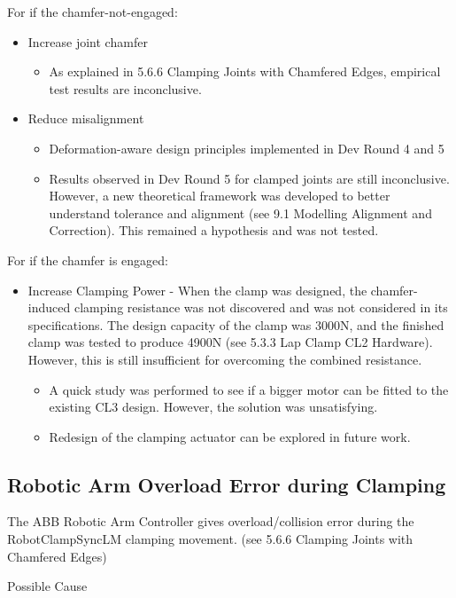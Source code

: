 For if the chamfer-not-engaged:
\begin{itemize}
\item Increase joint chamfer
    \begin{itemize}
    \item As explained in 5.6.6 Clamping Joints with Chamfered Edges, empirical test results are inconclusive.
    \end{itemize}
\item Reduce misalignment 
    \begin{itemize}
    \item Deformation-aware design principles implemented in Dev Round 4 and 5
    \item Results observed in Dev Round 5 for clamped joints are still inconclusive. However, a new theoretical framework was developed to better understand tolerance and alignment (see 9.1 Modelling Alignment and Correction). This remained a hypothesis and was not tested.
    \end{itemize}
\end{itemize}

For if the chamfer is engaged:
\begin{itemize}
\item Increase Clamping Power - When the clamp was designed, the chamfer-induced clamping resistance was not discovered and was not considered in its specifications. The design capacity of the clamp was 3000N, and the finished clamp was tested to produce 4900N (see 5.3.3 Lap Clamp CL2 Hardware). However, this is still insufficient for overcoming the combined resistance.
\begin{itemize}
    \item A quick study was performed to see if a bigger motor can be fitted to the existing CL3 design. However, the solution was unsatisfying.
    \item Redesign of the clamping actuator can be explored in future work.
    \end{itemize}
\end{itemize}

\subsection{Robotic Arm Overload Error during Clamping}
The ABB Robotic Arm Controller gives overload/collision error during the RobotClampSyncLM clamping movement. (see 5.6.6 Clamping Joints with Chamfered Edges)

Possible Cause


